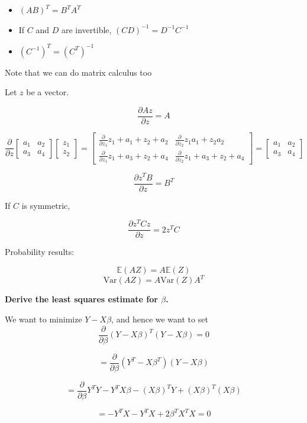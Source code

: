 \documentclass[
  letterpaper,
  DIV=11,
  numbers=noendperiod]{scrreport}
\providecommand{\tightlist}{%
  \setlength{\itemsep}{0pt}\setlength{\parskip}{0pt}}\usepackage{longtable,booktabs,array}
\begin{document}
\begin{itemize}
\tightlist
\item
  \((AB)^T = B^TA^T\)
\item
  If \(C\) and \(D\) are invertible, \((CD)^{-1} = D^{-1}C^{-1}\)
\item
  \((C^{-1})^T = (C^T)^{-1}\)
\end{itemize}

Note that we can do matrix calculus too

Let \(z\) be a vector.

\[ \frac{\partial Az}{\partial z} = A\]

\[ \frac{\partial}{\partial z} \left[ \begin{array}{cc} a_1 & a_2 \\ a_3 & a_4 \end{array} \right] \left[ \begin{array}{l} z_1 \\ z_2 \end{array} \right] = 
\left[ \begin{array}{cc} \frac{\partial}{\partial z_1} z_1 + a_1 + z_2 + a_2 & \frac{\partial}{\partial z_2} z_1 a_1 + z_2 a_2 \\ 
\frac{\partial}{\partial z_1} z_1 + a_3 + z_2 + a_4 & 
\frac{\partial}{\partial z_2} z_1 + a_3 + z_2 + a_4 \end{array}
\right] = 
\left[ \begin{array}{cc} a_1 & a_2 \\ a_3 & a_4 \end{array} \right]\]

\[ \frac{\partial z^T B}{\partial z} = B^T\]

If \(C\) is symmetric,

\[\frac{\partial z^T C z}{\partial z} = 2z^T C \]

Probability results:

\[\mathbb E(AZ) = A \mathbb E(Z)\]
\[\text{Var}(AZ) = A \text{Var}(Z) A^T\]

\textbf{Derive the least squares estimate for \(\beta\).}

We want to minimize \(Y - X\beta\), and hence we want to set
\[\frac{\partial}{\partial \beta} (Y - X\beta)^T(Y - X\beta) = 0\]

\[ = \frac{\partial}{\partial \beta} (Y^T - X\beta^T)(Y - X\beta)\]

\[ = \frac{\partial}{\partial \beta} Y^T Y - Y^T X \beta - (X\beta)^TY + (X\beta)^T(X\beta)\]

\[ = -Y^TX - Y^TX  + 2\beta^TX^TX = 0\]
\end{document}
